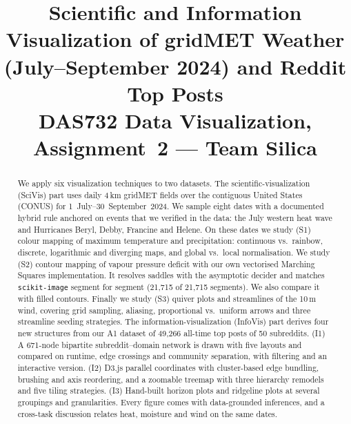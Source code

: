 \documentclass[conference]{IEEEtran}
\begin{document}
\title{Scientific and Information Visualization of gridMET Weather (July--September 2024) and Reddit Top Posts\\[0.2em]
{\large DAS732 Data Visualization, Assignment~2 --- Team Silica}}

\author{
\and
{}
\and
{}
}

\maketitle

\begin{abstract}
We apply six visualization techniques to two datasets. The scientific-visualization (SciVis) part uses daily 4\,km gridMET fields over the
contiguous United States (CONUS) for 1~July--30~September~2024. We sample eight dates with a documented hybrid rule
anchored on events that we verified in the data: the July western heat wave and Hurricanes Beryl, Debby, Francine and
Helene. On these dates we study (S1) colour mapping of maximum temperature and precipitation: continuous vs.\ rainbow,
discrete, logarithmic and diverging maps, and global vs.\ local normalisation. We study (S2) contour mapping of vapour pressure
deficit with our own vectorised Marching Squares implementation. It resolves saddles with the asymptotic decider and matches
\texttt{scikit-image} segment for segment (21,715 of 21,715 segments). We also compare it with filled contours. Finally we study
(S3) quiver plots and streamlines of the 10\,m wind, covering grid sampling, aliasing, proportional vs.\ uniform arrows and three
streamline seeding strategies. The information-visualization (InfoVis) part derives four new structures from our A1 dataset of
49,266 all-time top posts of 50 subreddits. (I1) A 671-node bipartite subreddit--domain network is drawn with five
layouts and compared on runtime, edge crossings and community separation, with filtering and an interactive version. (I2)
D3.js parallel coordinates with cluster-based edge bundling, brushing and axis reordering, and a zoomable treemap with three
hierarchy remodels and five tiling strategies. (I3) Hand-built horizon plots and ridgeline plots at several groupings and
granularities. Every figure comes with data-grounded inferences, and a cross-task discussion relates heat, moisture and wind on
the same dates.
\end{abstract}
\end{document}
